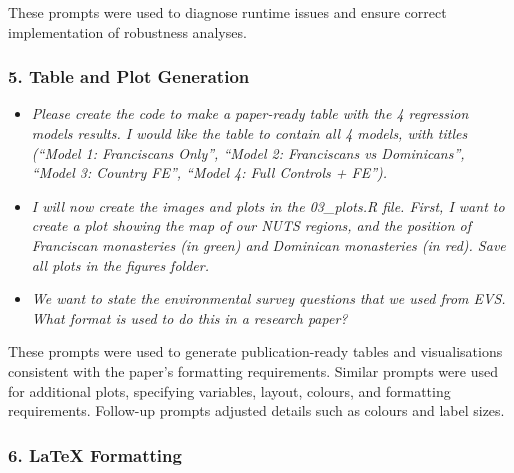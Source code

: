 \documentclass[12pt, a4paper]{article}
\begin{document}
These prompts were used to diagnose runtime issues and ensure correct implementation of robustness analyses.


\subsubsection*{5. Table and Plot Generation}

\begin{itemize}
\item \textit{Please create the code to make a paper-ready table with the 4 regression models results. I would like the table to contain all 4 models, with titles (``Model 1: Franciscans Only'', ``Model 2: Franciscans vs Dominicans'', ``Model 3: Country FE'', ``Model 4: Full Controls + FE'').}

\item \textit{I will now create the images and plots in the 03\_plots.R file. First, I want to create a plot showing the map of our NUTS regions, and the position of Franciscan monasteries (in green) and Dominican monasteries (in red). Save all plots in the figures folder.}

\item \textit{We want to state the environmental survey questions that we used from EVS. What format is used to do this in a research paper?}
\end{itemize}

These prompts were used to generate publication-ready tables and visualisations consistent with the paper’s formatting requirements. Similar prompts were used for additional plots, specifying variables, layout, colours, and formatting requirements. Follow-up prompts adjusted details such as colours and label sizes.

\subsubsection*{6. LaTeX Formatting}
\end{document}
